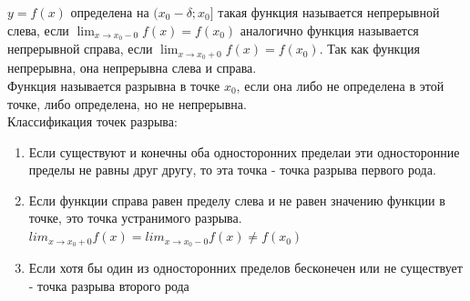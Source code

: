 \documentclass[oneside]{book}
\begin{document}
\begin{enumerate}
$y = f(x)$ определена на $(x_0 - \delta; x_0]$ такая функция называется непрерывной слева, если $\lim_{x \rightarrow x_0 - 0}{f(x)} = f(x_0)$
аналогично функция называется непрерывной справа, если $\lim_{x \rightarrow x_0 + 0}{f(x)} = f(x_0)$. Так как функция непрерывна,
она непрерывна слева и справа. \\
Функция называется разрывна в точке $x_0$, если она либо не определена в этой точке, либо определена, но не непрерывна. \\
Классификация точек разрыва:
\begin{enumerate}
    \item Если существуют и конечны оба односторонних пределаи эти односторонние пределы не равны друг другу, то эта точка - точка разрыва
          первого рода.
    \item Если функции справа равен пределу слева и не равен значению функции в точке, это точка устранимого разрыва.
          $lim_{x \rightarrow x_0+0}{f(x)} = lim_{x \rightarrow x_0-0}{f(x)} \neq f(x_0)$
    \item Если хотя бы один из односторонних пределов бесконечен или не существует - точка разрыва второго рода
\end{enumerate}


\end{enumerate}
\end{document}
